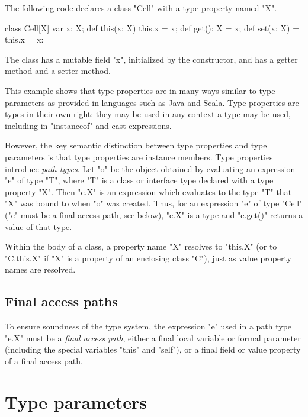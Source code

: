 The following code declares a class \xcd"Cell" with a type
property named \xcd"X".
\begin{xten}
class Cell[X] {
    var x: X;
    def this(x: X) { this.x = x; }
    def get(): X = x;
    def set(x: X) = { this.x = x: }
}
\end{xten}
The class has a mutable field \xcd"x", initialized by the
constructor, and has a getter method and a setter method.

This example shows that type properties are in many ways similar to
type parameters as provided in languages such as Java and Scala.
Type properties are types in their own right:
they may be used in any context a type may be used,
including in \xcd"instanceof" and cast expressions.

\label{PathTypes}

However, the key semantic distinction between type properties
and type parameters is that type properties are instance
members.
        Type properties introduce {\em path types}.
        Let \xcd"o" be the object obtained by evaluating an expression
	\xcd"e" of type \xcd"T", where 
        \xcd"T" is a class or interface type declared with
        a type property \xcd"X". Then \xcd"e.X" is an expression
	which evaluates to the type \xcd"T" that \xcd"X" was bound to when 
	\xcd"o" was created. 
Thus, for an expression \xcd"e" of type \xcd"Cell" (\xcd"e" must be a
final access path, see below), \xcd"e.X" is a type and \xcd"e.get()"
returns a value of that type.

Within the body of a class, a property name \xcd"X" resolves
to \xcd"this.X" (or to \xcd"C.this.X" if \xcd"X" is a property of
an enclosing class \xcd"C"), just as value property names are
resolved.
\fi

\iftypeparams
\else
\subsection{Final access paths}
\label{FinalAccessPath}

        To ensure soundness of the type system, the expression \xcd"e"
	used in a path type \xcd"e.X" must be a \emph{final access
	path}, either a final local variable or formal parameter
	(including the special variables \xcd"this" and \xcd"self"),
	or a final field or value property of a final access path.
\fi

\section{Type parameters}
\label{TypeParameters}


